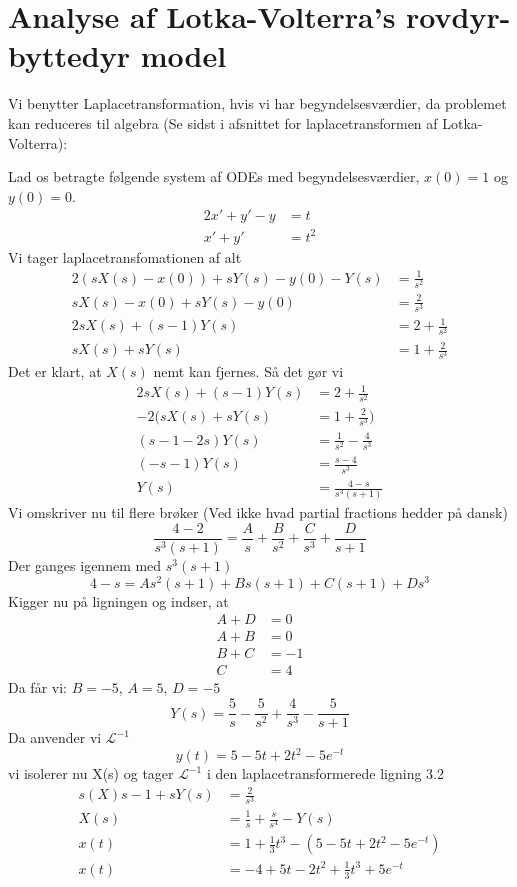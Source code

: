 \section{Analyse af Lotka-Volterra's rovdyr-byttedyr model}
Vi benytter Laplacetransformation, hvis vi har begyndelsesværdier, da problemet kan reduceres til algebra (Se sidst i afsnittet for laplacetransformen af Lotka-Volterra):
\begin{Example}
\textnormal{Lad os betragte følgende system af ODEs med begyndelsesværdier, $x(0)=1$ og $y(0)=0$.}
\begin{align}
    2x' + y' - y &= t\\
    x' + y' &= t^2
\end{align}
\textnormal{Vi tager laplacetransfomationen af alt}
\begin{align*}
    2(s X(s) - x(0)) + sY(s) - y(0) - Y(s) &= \frac{1}{s^2}\\
    s X(s) - x(0) + sY(s) - y(0) &= \frac{2}{s^3}\\
    2sX(s) + (s-1)Y(s) &= 2 + \frac{1}{s^2}\\
    sX(s) + sY(s) &= 1 + \frac{2}{s^3}
\end{align*}
\textnormal{Det er klart, at $X(s)$ nemt kan fjernes. Så det gør vi}
\begin{align*}
    2sX(s) + (s-1)Y(s) &= 2 + \frac{1}{s^2}\\
    -2(sX(s) + sY(s) &= 1 + \frac{2}{s^3})\\
    (s-1-2s)Y(s) &= \frac{1}{s^2} - \frac{4}{s^3}\\
    (-s-1)Y(s) &= \frac{s-4}{s^3}\\
    Y(s) &= \frac{4-s}{s^3(s + 1)}
\end{align*}
\textnormal{Vi omskriver nu til flere brøker (Ved ikke hvad partial fractions hedder på dansk)}
$$ \frac{4-2}{s^3(s+1)} = \frac{A}{s} + \frac{B}{s^2} + \frac{C}{s^3} + \frac{D}{s+1}$$
\textnormal{Der ganges igennem med $s^3(s+1)$}
$$ 4 - s = A s^2(s+1) + Bs(s+1) + C(s+1) + Ds^3$$
\textnormal{Kigger nu på ligningen og indser, at}
\begin{align*}
    A + D &= 0\\
    A + B &= 0\\
    B + C &= -1\\
    C &= 4
\end{align*}
\textnormal{Da får vi: $B = -5$, $A = 5$, $D = -5$}
$$Y(s) = \frac{5}{s} -\frac{5}{s^2} + \frac{4}{s^3} - \frac{5}{s+1}$$
\textnormal{Da anvender vi $\mathcal{L}^{-1}$}
$$ y(t) = 5 - 5t + 2t^2 - 5e^{-t}$$
\textnormal{vi isolerer nu X(s) og tager $\mathcal{L}^{-1}$ i den laplacetransformerede ligning 3.2}
\begin{align*}
    s(X)s - 1 + sY(s) &= \frac{2}{s^3}\\
    X(s) &= \frac{1}{s} + \frac{s}{s^4} - Y(s)\\
    x(t) &= 1 + \frac{1}{3}t^3 - (5 - 5t + 2t^2 - 5e^{-t})\\
    x(t) &= -4 + 5t-2t^2 + \frac{1}{3}t^3 + 5e^{-t}
\end{align*}

\end{Example}



